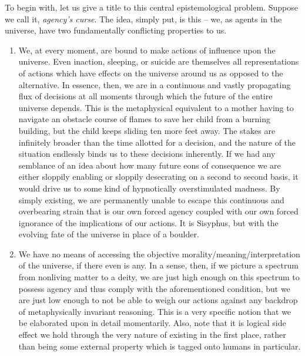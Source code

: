 To begin with, let us give a title to this central epistemological problem. Suppose we call it, \textit{agency's curse}. The idea, simply put, is this -- we, as agents in the universe, have two fundamentally conflicting properties to us.
\begin{enumerate}[label=Condition \arabic*.]
    \item We, at every moment, are bound to make actions of influence upon the universe. Even inaction, sleeping, or suicide are themselves all representations of actions which have effects on the universe around us as opposed to the alternative. In essence, then, we are in a continuous and vastly propagating flux of decisions at all moments through which the future of the entire universe depends. This is the metaphysical equivalent to a mother having to navigate an obstacle course of flames to save her child from a burning building, but the child keeps sliding ten more feet away. The stakes are infinitely broader than the time allotted for a decision, and the nature of the situation endlessly binds us to these decisions inherently. If we had any semblance of an idea about how many future eons of consequence we are either sloppily enabling or sloppily desecrating on a second to second basis, it would drive us to some kind of hypnotically overstimulated madness. By simply existing, we are permanently unable to escape this continuous and overbearing strain that is our own forced agency coupled with our own forced ignorance of the implications of our actions. It is Sisyphus, but with the evolving fate of the universe in place of a boulder. 
    \item We have no means of accessing the objective morality/meaning/interpretation of the universe, if there even is any. In a sense, then, if we picture a spectrum from nonliving matter to a deity, we are just high enough on this spectrum to possess agency and thus comply with the aforementioned condition, but we are just low enough to not be able to weigh our actions against any backdrop of metaphysically invariant reasoning. This is a very specific notion that we be elaborated upon in detail momentarily. Also, note that it is logical side effect we hold through the very nature of existing in the first place, rather than being some external property which is tagged onto humans in particular. 
\end{enumerate}
